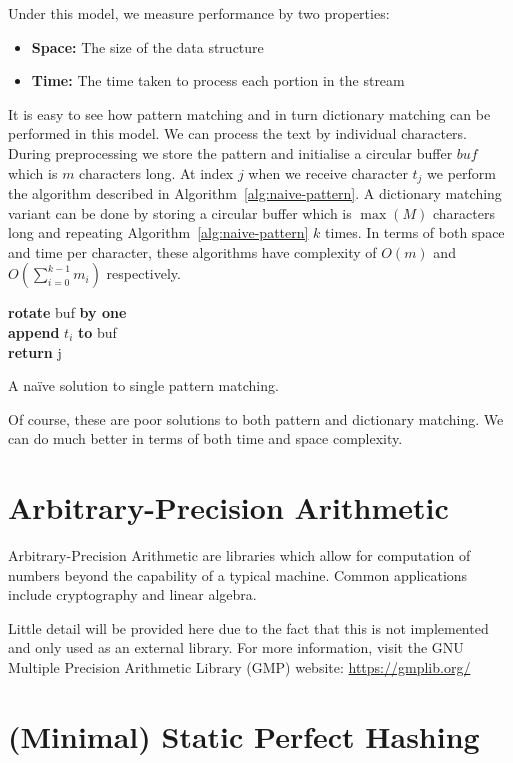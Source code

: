 \documentclass[ %
                    author={Dominic Joseph Moylett},
                    degree={MEng},
                     title={Dictionary Matching with Fingerprints},
                  subtitle={An Empirical Analysis},
                      type={research},
                      year={2015} ]{dissertation}
\begin{document}
Under this model, we measure performance by two properties:
\begin{itemize}
  \item {\bf Space:} The size of the data structure
  \item {\bf Time:} The time taken to process each portion in the stream
\end{itemize}

It is easy to see how pattern matching and in turn dictionary matching can be performed in this model. We can process the text by individual characters. During preprocessing we store the pattern and initialise a circular buffer $buf$ which is $m$ characters long. At index $j$ when we receive character $t_j$ we perform the algorithm described in Algorithm~\ref{alg:naive-pattern}. A dictionary matching variant can be done by storing a circular buffer which is $\max(M)$ characters long and repeating Algorithm~\ref{alg:naive-pattern} $k$ times. In terms of both space and time per character, these algorithms have complexity of $O(m)$ and $O(\sum^{k-1}_{i=0}m_i)$ respectively.

\begin{algorithm}[t]
{\bf rotate} buf {\bf by one}\\
{\bf append} $t_i$ {\bf to} buf\\
{\bf return} j
\caption{A na\"{i}ve solution to single pattern matching.}
\label{alg:naive-pattern}
\end{algorithm}

Of course, these are poor solutions to both pattern and dictionary matching. We can do much better in terms of both time and space complexity.

\section{Arbitrary-Precision Arithmetic}

Arbitrary-Precision Arithmetic are libraries which allow for computation of numbers beyond the capability of a typical machine. Common applications include cryptography and linear algebra.

Little detail will be provided here due to the fact that this is not implemented and only used as an external library. For more information, visit the GNU Multiple Precision Arithmetic Library (GMP) website: \url{https://gmplib.org/}

\section{(Minimal) Static Perfect Hashing}
\label{min-perf-hash}
\end{document}
